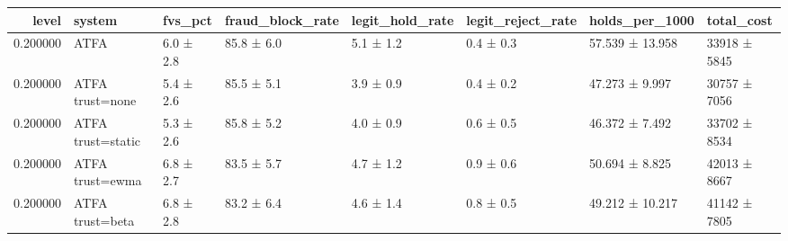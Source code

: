 \begin{tabular}{rlllllll}
\toprule
level & system & fvs\_pct & fraud\_block\_rate & legit\_hold\_rate & legit\_reject\_rate & holds\_per\_1000 & total\_cost \\
\midrule
0.200000 & ATFA & 6.0 ± 2.8 & 85.8 ± 6.0 & 5.1 ± 1.2 & 0.4 ± 0.3 & 57.539 ± 13.958 & 33918 ± 5845 \\
0.200000 & ATFA trust=none & 5.4 ± 2.6 & 85.5 ± 5.1 & 3.9 ± 0.9 & 0.4 ± 0.2 & 47.273 ± 9.997 & 30757 ± 7056 \\
0.200000 & ATFA trust=static & 5.3 ± 2.6 & 85.8 ± 5.2 & 4.0 ± 0.9 & 0.6 ± 0.5 & 46.372 ± 7.492 & 33702 ± 8534 \\
0.200000 & ATFA trust=ewma & 6.8 ± 2.7 & 83.5 ± 5.7 & 4.7 ± 1.2 & 0.9 ± 0.6 & 50.694 ± 8.825 & 42013 ± 8667 \\
0.200000 & ATFA trust=beta & 6.8 ± 2.8 & 83.2 ± 6.4 & 4.6 ± 1.4 & 0.8 ± 0.5 & 49.212 ± 10.217 & 41142 ± 7805 \\
\bottomrule
\end{tabular}
